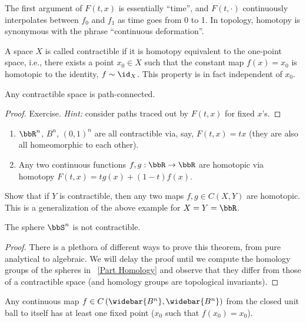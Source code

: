 The first argument of $F(t,x)$ is essentially ``time'', and $F(t,\cdot)$ continuously interpolates between $f_0$ and $f_1$ as time goes from 0 to 1. In topology, homotopy is synonymous with the phrase ``continuous deformation''.


\begin{defn}
    A space $X$ is called contractible if it is homotopy equivalent to the one-point space, i.e., there exists a point $x_0\in X$ such that the constant map $f(x)=x_0$ is homotopic to the identity, $f\sim \id_X$. This property is in fact independent of $x_0$.
\end{defn}
\begin{prop}
    Any contractible space is path-connected.
\end{prop}
\begin{proof}
    Exercise. \emph{Hint:} consider paths traced out by $F(t,x)$ for fixed $x$'s.
\end{proof}
\begin{example}
\begin{enumerate}
    \item $\bbR^n$, $B^n$, $(0,1)^n$ are all contractible via, say, $F(t,x)=tx$ (they are also all homeomorphic to each other).
    \item Any two continuous functions $f,g:\bbR \to\bbR $ are homotopic via homotopy $F(t,x)=tg(x)+(1-t)f(x)$.
\end{enumerate}
\end{example}
\begin{xca}
    Show that if $Y$ is contractible, then any two maps $f,g\in C(X,Y)$ are homotopic. This is a generalization of the above example for $X=Y=\bbR $.
\end{xca}
\begin{thm}[Brouwer]
    The sphere $\bbS^n$ is not contractible.
\end{thm}
\begin{proof}
    There is a plethora of different ways to prove this theorem, from pure analytical to algebraic. We will delay the proof until we compute the homology groups of the spheres in \Part~\ref{Part Homology} and observe that they differ from those of a contractible space (and homology groups are topological invariants).
\end{proof}
\begin{thm}\label{thm Brouwer's fixed point}
    Any continuous map $f\in C\left(\widebar{B^n},\widebar{B^n}\right)$  from the closed unit ball to itself has at least one fixed point ($x_0$ such that $f(x_0)=x_0$).
\end{thm}
